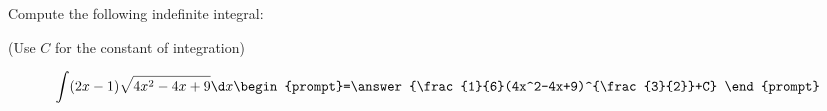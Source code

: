 \documentclass{ximera}
\author{Jim Talamo}
\begin{document}
\begin{exercise}
Compute the following indefinite integral:

\begin{prompt} (Use $C$ for the constant of integration) \end{prompt}

\[
\int (2x-1)\sqrt{4x^2-4x+9} \d x 
\begin{prompt}=\answer{\frac{1}{6}(4x^2-4x+9)^{\frac{3}{2}}+C} \end{prompt}
\]
\end{exercise}
\end{document}
